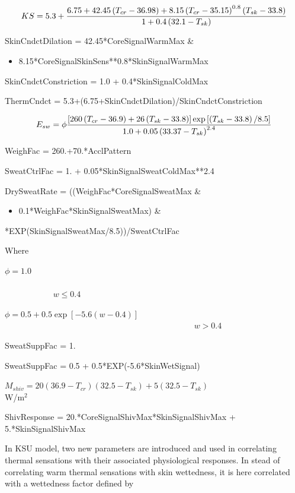 \begin{equation}
  KS = 5.3 + \frac{6.75+42.45\PB{T_{cr}-36.98}+8.15\PB{T_{cr}-35.15}^{0.8}\PB{T_{sk}-33.8}}{1+0.4\PB{32.1-T_{sk}}}
\end{equation}

SkinCndctDilation = 42.45*CoreSignalWarmMax \&

\begin{itemize}
\tightlist
\item
  8.15*CoreSignalSkinSens**0.8*SkinSignalWarmMax
\end{itemize}

SkinCndctConstriction = 1.0 + 0.4*SkinSignalColdMax

ThermCndct = 5.3+(6.75+SkinCndctDilation)/SkinCndctConstriction

\begin{equation}
  E_{sw} = \phi \frac{\RB{260\PB{T_{cr} - 36.9} + 26\PB{T_{sk} - 33.8}} \exp\RB{\PB{T_{sk} - 33.8}/8.5}}{1.0 + 0.05\PB{33.37 - T_{sk}}^{2.4}}
\end{equation}

WeighFac = 260.+70.*AcclPattern

SweatCtrlFac = 1. + 0.05*SkinSignalSweatColdMax**2.4

DrySweatRate = ((WeighFac*CoreSignalSweatMax \&

\begin{itemize}
\tightlist
\item
  0.1*WeighFac*SkinSignalSweatMax) \&
\end{itemize}

*EXP(SkinSignalSweatMax/8.5))/SweatCtrlFac

Where

\(\phi = 1.0\) ~~~~~~~~~~~~~~~~~~~~~~~~~~~~~~~~~~~~~~~~~~~~~~~~~~~~~~~~~~~~~~~~~~~~~~~~~~~~~~~~~~~ \(w \le 0.4\)

\(\phi = 0.5 + 0.5\exp [ - 5.6(w - 0.4)]\) ~~~~~~~~~~~~~~~~~~~~~~~~~~~~~~~~~~~~~~~~~~~~~ \(w > 0.4\)

SweatSuppFac = 1.

SweatSuppFac = 0.5 + 0.5*EXP(-5.6*SkinWetSignal)

\({M_{shiv}} = 20(36.9 - {T_{cr}})(32.5 - {T_{sk}}) + 5(32.5 - {T_{sk}})\) ~~~~~~~~~~~~~~~~~~~~ W/m\(^{2}\)

ShivResponse = 20.*CoreSignalShivMax*SkinSignalShivMax + 5.*SkinSignalShivMax

In KSU model, two new parameters are introduced and used in correlating thermal sensations with their associated physiological responses. In stead of correlating warm thermal sensations with skin wettedness, it is here correlated with a wettedness factor defined by


